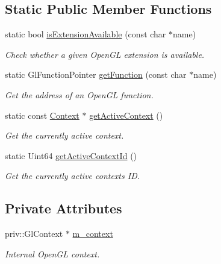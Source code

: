 \subsection*{Static Public Member Functions}
\begin{DoxyCompactItemize}
\item 
static bool \mbox{\hyperlink{classsf_1_1_context_a163c7f72c0c20133606657d895faa147}{is\+Extension\+Available}} (const char $\ast$name)
\begin{DoxyCompactList}\small\item\em Check whether a given Open\+GL extension is available. \end{DoxyCompactList}\item 
static Gl\+Function\+Pointer \mbox{\hyperlink{classsf_1_1_context_a998980d311effdf6223ce40d934c23c3}{get\+Function}} (const char $\ast$name)
\begin{DoxyCompactList}\small\item\em Get the address of an Open\+GL function. \end{DoxyCompactList}\item 
static const \mbox{\hyperlink{classsf_1_1_context}{Context}} $\ast$ \mbox{\hyperlink{classsf_1_1_context_a26ec3ddaf11a37c0630624037c4eea2d}{get\+Active\+Context}} ()
\begin{DoxyCompactList}\small\item\em Get the currently active context. \end{DoxyCompactList}\item 
static Uint64 \mbox{\hyperlink{classsf_1_1_context_a61b1cb0a99b8e3ce56579d70aa41fb70}{get\+Active\+Context\+Id}} ()
\begin{DoxyCompactList}\small\item\em Get the currently active context\textquotesingle{}s ID. \end{DoxyCompactList}\end{DoxyCompactItemize}
\subsection*{Private Attributes}
\begin{DoxyCompactItemize}
\item 
\mbox{\label{classsf_1_1_context_ae996b50e48707b7a21ba39aa1a73a998}} 
priv\+::\+Gl\+Context $\ast$ \mbox{\hyperlink{classsf_1_1_context_ae996b50e48707b7a21ba39aa1a73a998}{m\+\_\+context}}
\begin{DoxyCompactList}\small\item\em Internal Open\+GL context. \end{DoxyCompactList}\end{DoxyCompactItemize}
